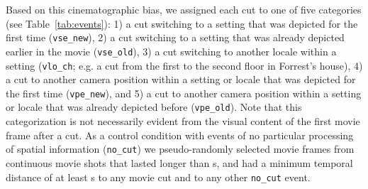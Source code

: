 \documentclass[english,11pt]{article}
\begin{document}
Based on this cinematographic bias, we assigned each cut to one of five
categories (see Table~\ref{tab:events}):
%
1) a cut switching to a setting that was depicted for the first time
(\texttt{vse\_new}),
%
2) a cut switching to a setting that was already depicted earlier in the movie
(\texttt{vse\_old}),
%
3) a cut switching to another locale within a setting (\texttt{vlo\_ch}; e.g. a
cut from the first to the second floor in Forrest's house),
%
4) a cut to another camera position within a setting or locale that was depicted
for the first time (\texttt{vpe\_new}), and
%
5) a cut to another camera position within a setting or locale that was already
depicted before (\texttt{vpe\_old}).
Note that this categorization is not necessarily evident from the visual content
of the first movie frame after a cut.
As a control condition with events of no particular processing of spatial
information (\texttt{no\_cut}) we pseudo-randomly selected movie frames from
continuous movie shots that lasted longer than \unit[20]{s}, and
had a minimum temporal distance of at least \unit[10]{s} to any movie cut and to
any other \texttt{no\_cut} event.
\end{document}
